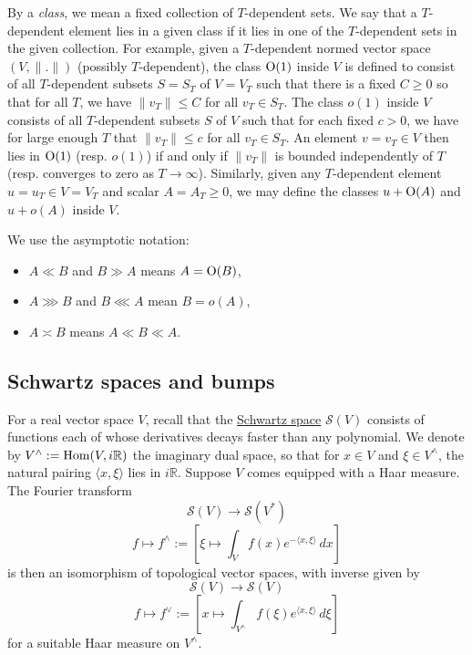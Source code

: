 \documentclass[reqno]{amsart} 
\numberwithin{equation}{section}
\numberwithin{theorem}{section}
\begin{document}
By a \emph{class}, we mean a fixed collection of $T$-dependent sets.  We say that a $T$-dependent element lies in a given class if it lies in one of the $T$-dependent sets in the given collection.  For example, given a $T$-dependent normed vector space $(V, \lVert . \rVert)$ (possibly $T$-dependent), the class $\operatorname{O}(1)$ inside $V$ is defined to consist of all $T$-dependent subsets $S = S_T$ of $V = V_T$ such that there is a fixed $C \geq 0$ so that for all $T$, we have $\lVert v_T \rVert \leq C$ for all $v_T \in S_T$.  The class $o(1)$ inside $V$ consists of all $T$-dependent subsets $S$ of $V$ such that for each fixed $c > 0$, we have for large enough $T$ that $\lVert v_T \rVert \leq c$ for all $v_T \in S_T$.  An element $v = v_T \in V$ then lies in $\operatorname{O}(1)$ (resp. $o(1)$) if and only if $\lVert v_T \rVert$ is bounded independently of $T$ (resp. converges to zero as $T \rightarrow \infty$).  Similarly, given any $T$-dependent element $u = u_T \in V = V_T$ and scalar $A = A_T \geq 0$, we may define the classes $u + \operatorname{O}(A)$ and $u + o(A)$ inside $V$.

We use the asymptotic notation:
\begin{itemize}
\item $A \ll B$ and $B \gg A$ means $A = \operatorname{O}(B)$, 
\item $A \ggg B$ and $B \lll A$ mean $B = o(A)$, 
\item $A \asymp B$ means $A \ll B \ll A$.
\end{itemize}

\subsection{Schwartz spaces and bumps}\label{sec:d1a8de614869}
For a real vector space $V$, recall that the \href{https://en.wikipedia.org/wiki/Schwartz_space}{Schwartz space} $\mathcal{S}(V)$ consists of functions each of whose derivatives decays faster than any polynomial.  We denote by $V^\wedge := \operatorname{Hom}(V, i \mathbb{R})$ the imaginary dual space, so that for $x \in V$ and $\xi \in V^\wedge$, the natural pairing $\langle x, \xi  \rangle$ lies in $i \mathbb{R}$.  Suppose $V$ comes equipped with a Haar measure.  The Fourier transform
\begin{equation*}
\mathcal{S}(V) \rightarrow \mathcal{S}(V^*)
\end{equation*}
\begin{equation*}
f \mapsto f^\wedge := \left[ \xi \mapsto \int_{V} f(x) e^{- \langle x, \xi  \rangle} \, d x \right]
\end{equation*}
is then an isomorphism of topological vector spaces, with inverse given by
\begin{equation*}
\mathcal{S}(V) \rightarrow \mathcal{S}(V)
\end{equation*}
\begin{equation}\label{eqn:d1a913db4ab4}
f \mapsto f^\vee := \left[ x \mapsto \int_{V^\wedge} f(\xi) e^{\langle x, \xi  \rangle} \, d \xi  \right]
\end{equation}
for a suitable Haar measure on $V^\wedge $.
\end{document}
